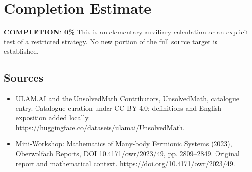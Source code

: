 \documentclass[11pt]{article}
\begin{document}
\section{Completion Estimate}
\noindent\textbf{COMPLETION: 0\%}
This is an elementary auxiliary calculation or an explicit test of a restricted strategy. No new portion of the full source target is established.

\subsection{Sources}
\begin{itemize}
\item[\hypertarget{source:statement:1}{S1}] ULAM.AI and the UnsolvedMath Contributors, UnsolvedMath, catalogue entry. Catalogue curation under CC BY 4.0; definitions and English exposition added locally.
\url{https://huggingface.co/datasets/ulamai/UnsolvedMath}.
\item[\hypertarget{source:statement:2}{S2}] Mini-Workshop: Mathematics of Many-body Fermionic Systems (2023), Oberwolfach Reports, DOI 10.4171/owr/2023/49, pp. 2809--2849. Original report and mathematical context.
\url{https://doi.org/10.4171/owr/2023/49}.
\end{itemize}
\label{end:statement}
\end{document}
